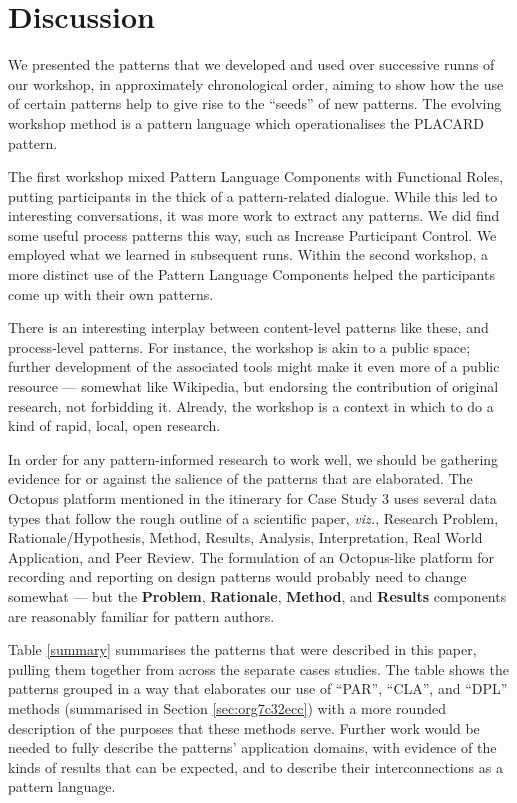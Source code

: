\documentclass[acmlarge,timestamp]{acmart}
\begin{document}
\section{Discussion}

We presented the patterns that we developed and used over successive
runns of our workshop, in approximately chronological order, aiming to
show how the use of certain patterns help to give rise to the
``seeds'' of new patterns.  The evolving workshop method is a pattern
language which operationalises the PLACARD pattern.

The first workshop mixed {\sc Pattern Language Components} with {\sc
  Functional Roles}, putting participants in the thick of a
pattern-related dialogue.  While this led to interesting
conversations, it was more work to extract any patterns.  We did find some useful process
patterns this way, such as {\sc Increase Participant Control}.  We employed what we learned in subsequent
runs.   Within the second workshop, a more distinct use
of the {\sc Pattern Language Components} helped the participants come
up with their own patterns.

There is an interesting interplay between content-level patterns like
these, and process-level patterns.  For instance, the workshop is akin
to a public space; further development of the associated tools might
make it even more of a public resource — somewhat like Wikipedia, but endorsing the contribution of original research, not forbidding it.  Already, the workshop is a context in which to do a kind of rapid, local, open research.

In order for any pattern-informed research to work well, we should be gathering evidence for or against the salience of the patterns that are elaborated.  The Octopus platform mentioned in the itinerary for Case Study 3 uses several data types that follow the rough outline of a scientific paper, \emph{viz.},
Research Problem,
Rationale/Hypothesis,
Method,
Results,
Analysis,
Interpretation,
Real World Application, and
Peer Review.
The formulation of an Octopus-like platform for recording and reporting on design patterns would probably need to change somewhat — but the \textbf{Problem}, \textbf{Rationale}, \textbf{Method}, and \textbf{Results} components are reasonably familiar for pattern authors.

Table \ref{summary} summarises the patterns that were described in
this paper, pulling them together from across the separate cases studies.  The table shows the patterns grouped in a way that elaborates
our use of “PAR”, “CLA”, and “DPL” methods (summarised in Section \ref{sec:org7c32ecc}) with a more rounded
description of the purposes that these methods serve.  Further work
would be needed to fully describe the patterns’
application domains, with evidence of the kinds of results that can be expected, and to describe their interconnections as a pattern language.
\end{document}
